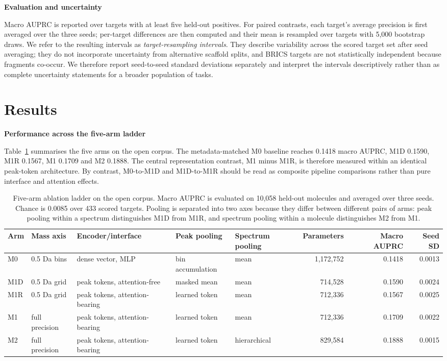 \documentclass[11pt]{article}
\newcommand{\hd}[1]{\medskip\par\noindent\textbf{#1}\par\nobreak\vspace{2pt}\noindent\ignorespaces}
\begin{document}
\hd{Evaluation and uncertainty}
Macro AUPRC is reported over targets with at least five held-out positives. For paired contrasts, each target's average precision is first averaged over the three seeds; per-target differences are then computed and their mean is resampled over targets with 5,000 bootstrap draws. We refer to the resulting intervals as \emph{target-resampling intervals}. They describe variability across the scored target set after seed averaging; they do not incorporate uncertainty from alternative scaffold splits, and BRICS targets are not statistically independent because fragments co-occur. We therefore report seed-to-seed standard deviations separately and interpret the intervals descriptively rather than as complete uncertainty statements for a broader population of tasks.

\section*{Results}
\hd{Performance across the five-arm ladder}
Table~\ref{tab:arms} summarises the five arms on the open corpus. The metadata-matched M0 baseline reaches 0.1418 macro AUPRC, M1D 0.1590, M1R 0.1567, M1 0.1709 and M2 0.1888. The central representation contrast, M1 minus M1R, is therefore measured within an identical peak-token architecture. By contrast, M0-to-M1D and M1D-to-M1R should be read as composite pipeline comparisons rather than pure interface and attention effects.

\begin{table}[ht]
\centering
\caption{Five-arm ablation ladder on the open corpus. Macro AUPRC is evaluated on 10,058 held-out molecules and averaged over three seeds. Chance is 0.0085 over 433 scored targets. Pooling is separated into two axes because they differ between different pairs of arms: peak pooling within a spectrum distinguishes M1D from M1R, and spectrum pooling within a molecule distinguishes M2 from M1.}
\label{tab:arms}
\small
\begin{tabular}{lllllrrr}
\toprule
Arm & Mass axis & Encoder/interface & Peak pooling & Spectrum pooling & Parameters & Macro AUPRC & Seed SD\\
\midrule
M0 & 0.5 Da bins & dense vector, MLP & bin accumulation & mean & 1,172,752 & 0.1418 & 0.0013\\
M1D & 0.5 Da grid & peak tokens, attention-free & masked mean & mean & 714,528 & 0.1590 & 0.0024\\
M1R & 0.5 Da grid & peak tokens, attention-bearing & learned token & mean & 712,336 & 0.1567 & 0.0025\\
M1 & full precision & peak tokens, attention-bearing & learned token & mean & 712,336 & 0.1709 & 0.0022\\
M2 & full precision & peak tokens, attention-bearing & learned token & hierarchical & 829,584 & 0.1888 & 0.0015\\
\bottomrule
\end{tabular}
\end{table}
\end{document}
